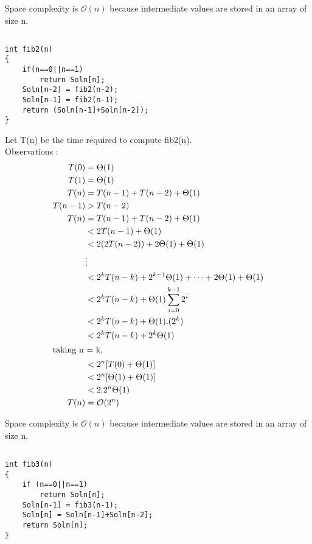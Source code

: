 \documentclass{article}
\begin{document}
Space complexity is $\mathcal{O}(n)$ because intermediate values are stored in an array of size n.

\newpage
\subsection{}
\begin{lstlisting}
int fib2(n)
{
	if(n==0||n==1) 
		return Soln[n];
	Soln[n-2] = fib2(n-2); 
	Soln[n-1] = fib2(n-1);
	return (Soln[n-1]+Soln[n-2]); 
}
\end{lstlisting}

Let T(n) be the time required to compute fib2(n). \\
Observations : \\
\begin{align*}
T(0) & = \Theta(1) \\
T(1) & = \Theta(1) \\
T(n) & = T(n-1) + T(n-2) + \Theta(1) \\
T(n-1) & > T(n-2) \\
T(n) & = T(n-1)+T(n-2) + \Theta(1) \\
& < 2T(n-1) + \Theta(1) \\
& < 2(2T(n-2)) + 2\Theta(1) + \Theta(1) \\
& \vdots \\
& < 2^kT(n-k) + 2^{k-1}\Theta(1) + \cdots + 2\Theta(1) + \Theta(1) \\
& < 2^kT(n-k) + \Theta(1)\sum_{i=0}^{k-1}2^i \\
& < 2^kT(n-k) + \Theta(1) . (2^k)\\
& < 2^kT(n-k) + 2^k\Theta(1)\\
\intertext{taking n = k,}
& < 2^n[T(0) + \Theta(1)] \\
& < 2^n[\Theta(1) + \Theta(1)] \\
& < 2.2^n\Theta(1) \\
T(n) & = \mathcal{O}(2^n)\\
\end{align*}

Space complexity is $\mathcal{O}(n)$ because intermediate values are stored in an array of size n.

\newpage
\subsection{}
\begin{lstlisting}
int fib3(n)
{
	if (n==0||n==1) 
		return Soln[n];
	Soln[n-1] = fib3(n-1);
	Soln[n] = Soln[n-1]+Soln[n-2];
	return Soln[n];
}
\end{lstlisting}
\end{document}
